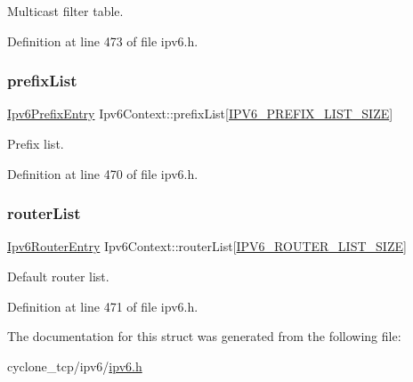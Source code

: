 Multicast filter table. 



Definition at line 473 of file ipv6.\+h.

\mbox{\label{structIpv6Context_aa70737b1f0de61b8ebd4c4a13889ae64}} 
\subsubsection{\texorpdfstring{prefix\+List}{prefixList}}
{\footnotesize\ttfamily \hyperlink{structIpv6PrefixEntry}{Ipv6\+Prefix\+Entry} Ipv6\+Context\+::prefix\+List\mbox{[}\hyperlink{ipv6_8h_a928a90013c8822cded35706806f00171}{I\+P\+V6\+\_\+\+P\+R\+E\+F\+I\+X\+\_\+\+L\+I\+S\+T\+\_\+\+S\+I\+ZE}\mbox{]}}



Prefix list. 



Definition at line 470 of file ipv6.\+h.

\mbox{\label{structIpv6Context_a4c25546c426cb05cd5cfba93b06de694}} 
\subsubsection{\texorpdfstring{router\+List}{routerList}}
{\footnotesize\ttfamily \hyperlink{structIpv6RouterEntry}{Ipv6\+Router\+Entry} Ipv6\+Context\+::router\+List\mbox{[}\hyperlink{ipv6_8h_af61cd2a89ea067f9ecd5a7f7d9649bba}{I\+P\+V6\+\_\+\+R\+O\+U\+T\+E\+R\+\_\+\+L\+I\+S\+T\+\_\+\+S\+I\+ZE}\mbox{]}}



Default router list. 



Definition at line 471 of file ipv6.\+h.



The documentation for this struct was generated from the following file\+:\begin{DoxyCompactItemize}
\item 
cyclone\+\_\+tcp/ipv6/\hyperlink{ipv6_8h}{ipv6.\+h}\end{DoxyCompactItemize}
